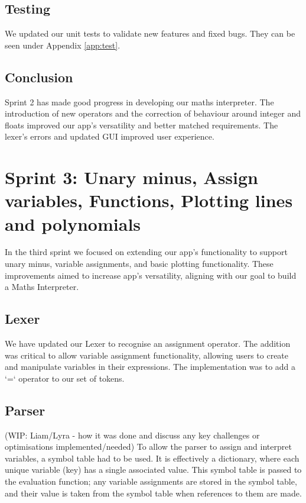 \documentclass[a4paper, oneside, 11pt]{report}
\begin{document}
\subsection{Testing}
We updated our unit tests to validate new features and fixed bugs. They can be seen under Appendix \ref{app:test}.

\subsection{Conclusion}
Sprint 2 has made good progress in developing our maths interpreter. The introduction of new operators and the correction of behaviour around integer and floats improved our app's versatility and better matched requirements. The lexer's errors and updated GUI improved user experience.


\section{Sprint 3: Unary minus, Assign variables, Functions, Plotting lines and polynomials}
In the third sprint we focused on extending our app’s functionality to support unary minus, variable assignments, and basic plotting functionality. These improvements aimed to increase app’s versatility, aligning with our goal to build a Maths Interpreter.

\subsection{Lexer}
We have updated our Lexer to recognise an assignment operator. The addition was critical to allow variable assignment functionality, allowing users to create and manipulate variables in their expressions. The implementation was to add a ‘=‘ operator to our set of tokens.

\subsection{Parser}
(WIP: Liam/Lyra - how it was done and discuss any key challenges or optimisations implemented/needed)
To allow the parser to assign and interpret variables, a symbol table had to be used. It is effectively a dictionary, where each unique variable (key) has a single associated value. This symbol table is passed to the evaluation function; any variable assignments are stored in the symbol table, and their value is taken from the symbol table when references to them are made. 
\end{document}
